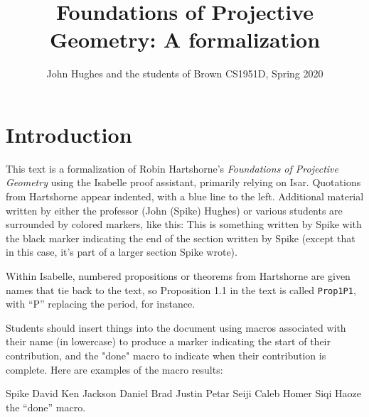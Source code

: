 \documentclass[11pt,notitlepage,openany]{book}
\begin{document}
\title{Foundations of Projective Geometry: A formalization}
\author{John Hughes and the students of Brown CS1951D, Spring 2020}
\maketitle



\chapter*{Introduction}
This text is a formalization of Robin Hartshorne's \emph{Foundations of Projective Geometry}
using the Isabelle proof assistant, primarily relying on Isar. Quotations 
from Hartshorne appear indented, with a blue line to the left. Additional material 
written by either the professor (John (Spike) Hughes) or various students are surrounded by colored 
markers, like this:
\spike
This is something written by Spike
\done
with the black marker indicating the end of the section written by Spike (except that in this case, 
it's part of a larger section Spike wrote). 

Within Isabelle, numbered propositions or theorems from Hartshorne are given names that tie back 
to the text, so Proposition 1.1 in the text is called \texttt{Prop1P1}, with ``P'' replacing the period, 
for instance. 

Students should insert things into the document using
macros associated with their name (in lowercase) to produce a marker indicating the start of their contribution, and the "done" macro to indicate when their contribution is complete. Here are examples of the macro results:

\spike Spike
\david David
\ken Ken
\jackson Jackson
\daniel Daniel
\brad Brad
\justin Justin
\petar Petar
\seiji Seiji
\caleb Caleb
\homer Homer
\siqi Siqi
\haoze Haoze
\done the ``done'' macro.






\end{document}
